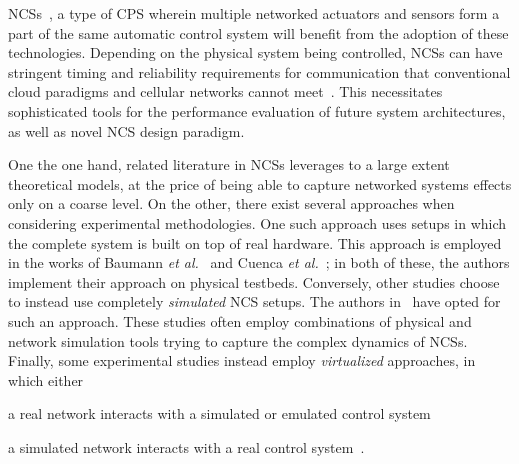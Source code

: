 \glspl{NCS}~\cite{Gupta2010NCSOverview}, a type of \gls{CPS} wherein multiple networked actuators and sensors form a part of the same automatic control system will benefit from the adoption of these technologies.
Depending on the physical system being controlled, \glspl{NCS} can have stringent timing and reliability requirements for communication that conventional cloud paradigms and cellular networks cannot meet~\cite{Wan2020Efficient}.
This necessitates sophisticated tools for the performance evaluation of future system architectures, as well as novel NCS design paradigm.


One the one hand, related literature in \glspl{NCS} leverages to a large extent theoretical models, at the price of being able to capture networked systems effects only on a coarse level.
On the other, there exist several approaches when considering experimental methodologies.
One such approach uses setups in which the complete system is built on top of real hardware.
This approach is employed in the works of Baumann \emph{et al.}~\cite{Baumann2018LowPower} and Cuenca \emph{et al.}~\cite{Cuenca2019UAV}; in both of these, the authors implement their approach on physical testbeds.
Conversely, other studies choose to instead use completely \emph{simulated} \gls{NCS} setups.
The authors in\ \cite{Ma2019DynamicSched} have opted for such an approach.
These studies often employ combinations of physical and network simulation tools trying to capture the complex dynamics of \glspl{NCS}.
Finally, some experimental studies instead employ \emph{virtualized} approaches, in which either
\begin{enumerate*}[itemjoin={{; }}, itemjoin*={{; or }}]
    \item a real network interacts with a simulated or emulated control system~\cite{Wang2020VoltageControl}
    \item a simulated network interacts with a real control system~\cite{Natale2004InvPendEthernet}.
\end{enumerate*}

